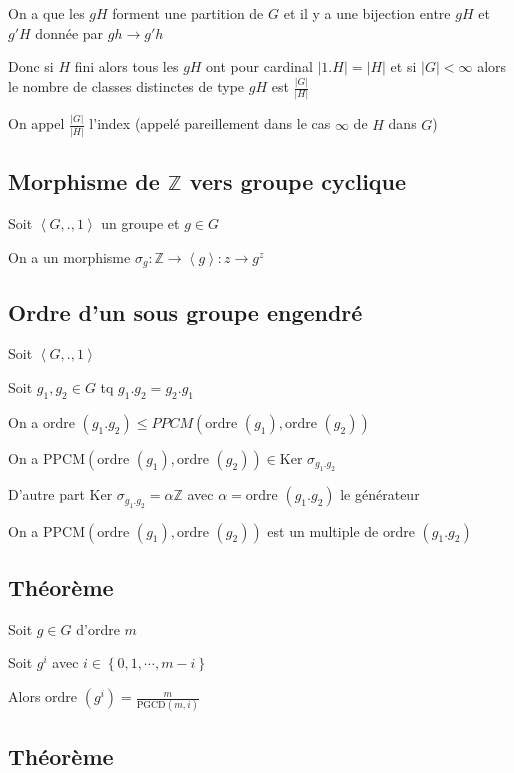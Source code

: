 \documentclass[a4paper,10pt]{article}
\newcommand{\Ker}{\mbox{Ker }}
\newcommand{\grp}[1]{\left\langle #1 \right\rangle}
\newcommand{\ap}{\rightarrow}
\newcommand{\Z}{\mathbb{Z}}
\newcommand{\tset}[1]{\left\lbrace #1 \right\rbrace}
\newcommand{\PGCD}{\mbox{PGCD}}
\newcommand{\PPCM}{\mbox{PPCM}}
\newcommand{\ordre}{\mbox{ordre }}
\begin{document}
On a que les $gH$ forment une partition de $G$ et il y a une bijection entre $gH$ et $g'H$ donnée par $gh \ap g'h$

Donc si $H$ fini alors tous les $gH$ ont pour cardinal $\vert 1.H \vert = \vert H \vert$ et si $\vert G \vert < \infty$ alors le nombre de classes distinctes de type $gH$ est $\frac{\vert G \vert}{\vert H \vert}$ 

On appel $\frac{\vert G \vert}{\vert H \vert}$ l'index (appelé pareillement dans le cas $\infty$ de $H$ dans $G$)

\subsection{Morphisme de $\Z$ vers groupe cyclique}

Soit $\grp{G,.,1}$ un groupe et $g \in G$

On a un morphisme $\sigma_g : \Z \ap \grp{g} : z \ap g^z$


\subsection{Ordre d'un sous groupe engendré}

Soit $\grp{G,.,1}$

Soit $g_1,g_2 \in G$ tq $g_1.g_2 = g_2.g_1$

On a $\ordre(g_1.g_2) \leq PPCM(\ordre(g_1) , \ordre(g_2))$

On a $\PPCM(\ordre(g_1) , \ordre(g_2)) \in \Ker \sigma_{g_1.g_2}$

D'autre part $\Ker \sigma_{g_1.g_2} = \alpha \Z$ avec $\alpha = \ordre(g_1.g_2)$ le générateur

On a $\PPCM(\ordre(g_1) , \ordre(g_2))$ est un multiple de $\ordre(g_1.g_2)$

\subsection{Théorème}

Soit $g \in G$ d'ordre $m$

Soit $g^i$ avec $i \in \tset{0,1,\cdots,m-i}$

Alors $\ordre(g^i) = \frac{m}{\PGCD(m,i)}$



\subsection{Théorème}
\end{document}
